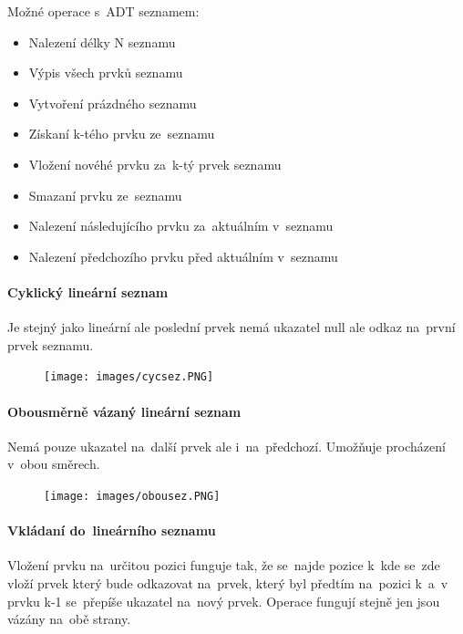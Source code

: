 Možné operace s~ADT seznamem:
\begin{itemize}[noitemsep]
	\item Nalezení délky N seznamu
	\item Výpis všech prvků seznamu
	\item Vytvoření prázdného seznamu
	\item Získaní k-tého prvku ze~seznamu
	\item Vložení novéhé prvku za~k-tý prvek seznamu
	\item Smazaní prvku ze~seznamu
	\item Nalezení následujícího prvku za~aktuálním v~seznamu
	\item Nalezení předchozího prvku před aktuálním v~seznamu
\end{itemize}

\paragraph{Cyklický lineární seznam} Je stejný jako lineární ale poslední prvek nemá ukazatel null ale odkaz na~první prvek seznamu.

\begin{figure}[ht]
	\centering
	\texttt{[image: images/cycsez.PNG]}
\end{figure}

\paragraph{Obousměrně vázaný lineární seznam} Nemá pouze ukazatel na~další prvek ale i~na~předchozí. Umožňuje procházení v~obou směrech.

\begin{figure}[ht]
	\centering
	\texttt{[image: images/obousez.PNG]}
\end{figure}

\paragraph{Vkládaní do~lineárního seznamu} Vložení prvku na~určitou pozici funguje tak, že se~najde pozice k~kde se~zde vloží prvek který bude odkazovat na~prvek, který byl předtím na~pozici k~a~v prvku k-1 se~přepíše ukazatel na~nový prvek. Operace fungují stejně jen jsou vázány na~obě strany.


